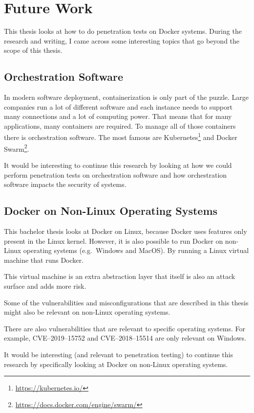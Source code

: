 \chapter{Future Work}\label{chapter:futurework}
This thesis looks at how to do penetration tests on Docker systems. During the research and writing, I came across some interesting topics that go beyond the scope of this thesis.

\section{Orchestration Software}
In modern software deployment, containerization is only part of the puzzle. Large companies run a lot of different software and each instance needs to support many connections and a lot of computing power. That means that for many applications, many containers are required. To manage all of those containers there is orchestration software. The most famous are Kubernetes\footnote{\url{https://kubernetes.io/}} and Docker Swarm\footnote{\url{https://docs.docker.com/engine/swarm/}}.

It would be interesting to continue this research by looking at how we could perform penetration tests on orchestration software and how orchestration software impacts the security of systems.

\section{Docker on Non-Linux Operating Systems}
This bachelor thesis looks at Docker on Linux, because Docker uses features only present in the Linux kernel. However, it is also possible to run Docker on non-Linux operating systems (e.g.\ Windows and MacOS). By running a Linux virtual machine that runs Docker.

This virtual machine is an extra abstraction layer that itself is also an attack surface and adds more risk.

\medskip

Some of the vulnerabilities and misconfigurations that are described in this thesis might also be relevant on non-Linux operating systems. 

There are also vulnerabilities that are relevant to specific operating systems. For example, CVE--2019--15752 and CVE--2018--15514 are only relevant on Windows. 

\medskip

It would be interesting (and relevant to penetration testing) to continue this research by specifically looking at Docker on non-Linux operating systems.

